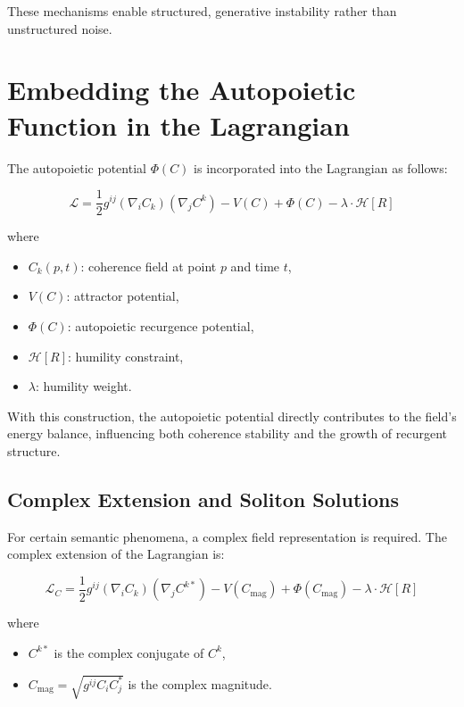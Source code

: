 These mechanisms enable structured, generative instability rather than unstructured noise.

\section{Embedding the Autopoietic Function in the Lagrangian}

The autopoietic potential \(\Phi(C)\) is incorporated into the Lagrangian as follows:

\begin{equation}
\mathcal{L} = \frac{1}{2} g^{ij} (\nabla_i C_k)(\nabla_j C^k) - V(C) + \Phi(C) - \lambda \cdot \mathcal{H}[R]
\end{equation}

where 
\begin{itemize}
    \item \(C_k(p,t)\): coherence field at point \(p\) and time \(t\),
    \item \(V(C)\): attractor potential,
    \item \(\Phi(C)\): autopoietic recurgence potential,
    \item \(\mathcal{H}[R]\): humility constraint,
    \item \(\lambda\): humility weight.
\end{itemize}

With this construction, the autopoietic potential directly contributes to the field's energy balance, influencing both coherence stability and the growth of recurgent structure.

\subsection{Complex Extension and Soliton Solutions}

For certain semantic phenomena, a complex field representation is required. The complex extension of the Lagrangian is:

\begin{equation}
\mathcal{L}_C = \frac{1}{2} g^{ij} (\nabla_i C_k)(\nabla_j C^{k*}) - V(C_{\mathrm{mag}}) + \Phi(C_{\mathrm{mag}}) - \lambda \cdot \mathcal{H}[R]
\end{equation}

where

\begin{itemize}
    \item \(C^{k*}\) is the complex conjugate of \(C^k\),
    \item \(C_{\mathrm{mag}} = \sqrt{g^{ij}C_i C_j^*}\) is the complex magnitude.
\end{itemize}

